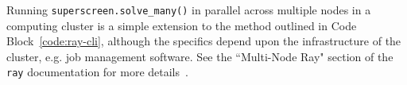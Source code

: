 \documentclass[final,3p,times]{elsarticle}
\newcommand{\inline}[1]{\texttt{#1}\xspace}
\newcommand{\SuperScreen}{\inline{SuperScreen}}
\begin{document}
Running \inline{superscreen.solve_many()} in parallel across multiple nodes in a computing cluster is a simple extension to the method outlined in Code Block~\ref{code:ray-cli}, although the specifics depend upon the infrastructure of the cluster, e.g. job management software. See the ``Multi-Node Ray" section of the \inline{ray} documentation for more details~\cite{ray-docs}.











\end{document}
